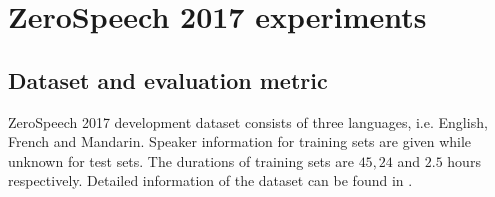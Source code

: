 \documentclass[a4paper]{article}
\begin{document}
% 

\section{ZeroSpeech 2017 experiments}
\label{sec:exp_setup}
\subsection{Dataset and evaluation metric}
ZeroSpeech 2017 development dataset consists of three languages, i.e. English, French and Mandarin. 
Speaker information  for training sets are given while unknown for test sets. The durations of training sets are $45, 24$ and $2.5$ hours respectively.
Detailed information of the dataset can be found in \cite{dunbar2017zero}.
\end{document}
